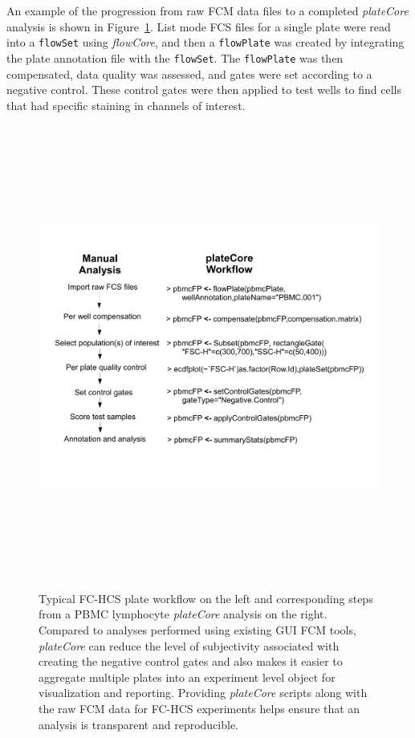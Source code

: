 \documentclass[12pt]{article}
\newcommand{\Robject}[1]{{\texttt{#1}}}
\newcommand{\Rpackage}[1]{{\textit{#1}}}
\begin{document}
An example of the progression from raw FCM data files to a completed
\Rpackage{plateCore} analysis is shown in Figure~\ref{fig:analysis}. List mode
FCS files for a single plate were read into a \Robject{flowSet} using
\Rpackage{flowCore}, and then a \Robject{flowPlate} was created by integrating
the plate annotation file with the \Robject{flowSet}. The \Robject{flowPlate}
was then compensated, data quality was assessed, and gates were set according
to a negative control. These control gates were then applied to test wells to
find cells that had specific staining in channels of interest.

\begin{figure}
\centering
\includegraphics[width=7in,height=6in]{analysisSteps.pdf}
\caption{Typical FC-HCS plate workflow on the left and corresponding steps from
a PBMC lymphocyte \Rpackage{plateCore} analysis on the right. Compared to
analyses performed using existing GUI FCM tools, \Rpackage{plateCore} can
reduce the level of subjectivity associated with creating the negative control
gates and also makes it easier to aggregate multiple plates into an experiment
level object for visualization and reporting. Providing \Rpackage{plateCore}
scripts along with the raw FCM data for FC-HCS experiments helps ensure that an
analysis is transparent and reproducible.}
\label{fig:analysis}
\end{figure}
\end{document}
